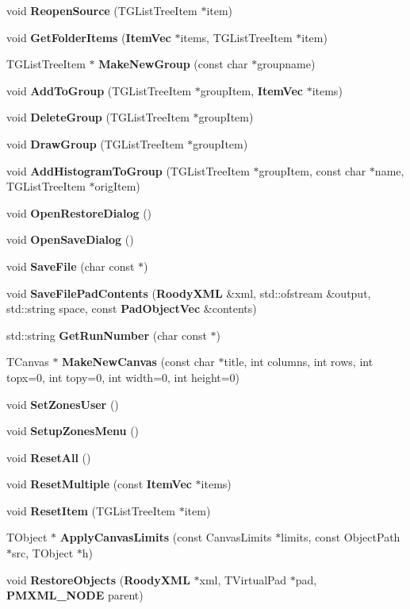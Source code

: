 \begin{DoxyCompactItemize}
\item 
void {\bf ReopenSource} (TGListTreeItem $\ast$item)
\item 
void {\bf GetFolderItems} ({\bf ItemVec} $\ast$items, TGListTreeItem $\ast$item)
\item 
TGListTreeItem $\ast$ {\bf MakeNewGroup} (const char $\ast$groupname)
\item 
void {\bf AddToGroup} (TGListTreeItem $\ast$groupItem, {\bf ItemVec} $\ast$items)
\item 
void {\bf DeleteGroup} (TGListTreeItem $\ast$groupItem)
\item 
void {\bf DrawGroup} (TGListTreeItem $\ast$groupItem)
\item 
void {\bf AddHistogramToGroup} (TGListTreeItem $\ast$groupItem, const char $\ast$name, TGListTreeItem $\ast$origItem)
\item 
void {\bf OpenRestoreDialog} ()
\item 
void {\bf OpenSaveDialog} ()
\item 
void {\bf SaveFile} (char const $\ast$)
\item 
void {\bf SaveFilePadContents} ({\bf RoodyXML} \&xml, std::ofstream \&output, std::string space, const {\bf PadObjectVec} \&contents)
\item 
std::string {\bf GetRunNumber} (char const $\ast$)
\item 
TCanvas $\ast$ {\bf MakeNewCanvas} (const char $\ast$title, int columns, int rows, int topx=0, int topy=0, int width=0, int height=0)
\item 
void {\bf SetZonesUser} ()
\item 
void {\bf SetupZonesMenu} ()
\item 
void {\bf ResetAll} ()
\item 
void {\bf ResetMultiple} (const {\bf ItemVec} $\ast$items)
\item 
void {\bf ResetItem} (TGListTreeItem $\ast$item)
\item 
TObject $\ast$ {\bf ApplyCanvasLimits} (const CanvasLimits $\ast$limits, const ObjectPath $\ast$src, TObject $\ast$h)
\item 
void {\bf RestoreObjects} ({\bf RoodyXML} $\ast$xml, TVirtualPad $\ast$pad, {\bf PMXML\_\-NODE} parent)
\end{DoxyCompactItemize}
